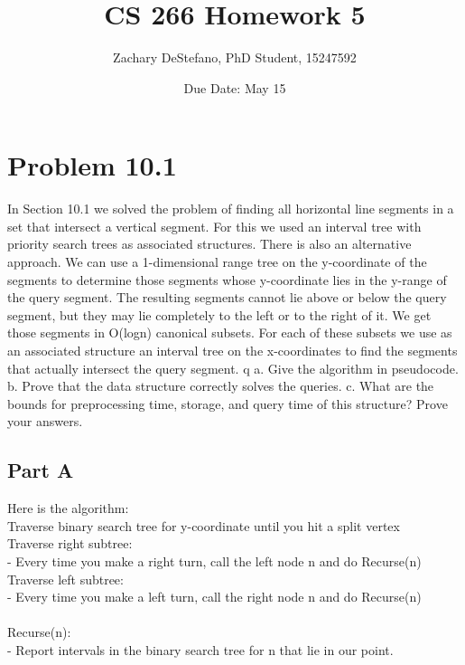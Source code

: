 \documentclass[11pt,psfig]{article}
\begin{document}
\setlength{\parskip}{1.2ex plus0.3ex minus 0.3ex}


\thispagestyle{empty} \pagestyle{myheadings} 



\title{CS 266 Homework 5}
\author{Zachary DeStefano, PhD Student, 15247592}
\date{Due Date: May 15}

\maketitle

\vfill\eject

\section*{Problem 10.1}

In Section 10.1 we solved the problem of finding all horizontal line
segments in a set that intersect a vertical segment. For this we used an
interval tree with priority search trees as associated structures. There
is also an alternative approach. We can use a 1-dimensional range tree
on the y-coordinate of the segments to determine those segments whose
y-coordinate lies in the y-range of the query segment. The resulting
segments cannot lie above or below the query segment, but they may
lie completely to the left or to the right of it. We get those segments
in O(logn) canonical subsets. For each of these subsets we use as an
associated structure an interval tree on the x-coordinates to find the
segments that actually intersect the query segment.
q
a. Give the algorithm in pseudocode.
b. Prove that the data structure correctly solves the queries.
c. What are the bounds for preprocessing time, storage, and query time
of this structure? Prove your answers.

\subsection*{Part A}

Here is the algorithm:\\
Traverse binary search tree for y-coordinate until you hit a split vertex\\
Traverse right subtree:\\
- Every time you make a right turn, call the left node n and do Recurse(n)\\
Traverse left subtree:\\
- Every time you make a left turn, call the right node n and do Recurse(n)\\
\\
Recurse(n):\\
- Report intervals in the binary search tree for n that lie in our point.\\
\\
\end{document}
